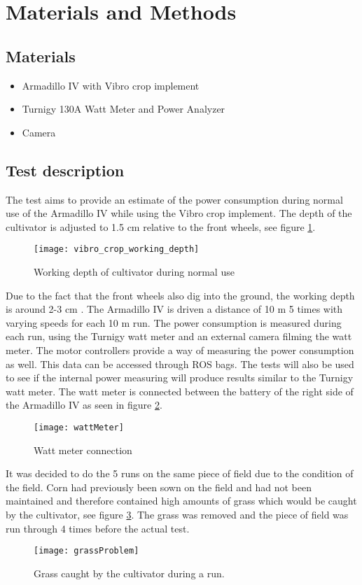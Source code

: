 \section{Materials and Methods}
\subsection{Materials}\label{Materials}
\begin{itemize}
	\item Armadillo IV with Vibro crop implement
	\item Turnigy 130A Watt Meter and Power Analyzer
	\item Camera
\end{itemize}
\subsection{Test description}
The test aims to provide an estimate of the power consumption during normal use of the Armadillo IV while using the Vibro crop implement. The depth of the cultivator is adjusted to 1.5 cm relative to the front wheels, see figure \ref{fig:vibro_crop_working_depth}.
\begin{figure}[hbtp]
	\centering
	\texttt{[image: vibro\_crop\_working\_depth]}
	\caption{Working depth of cultivator during normal use \cite{vibro_crop}}
	\label{fig:vibro_crop_working_depth}
\end{figure}
Due to the fact that the front wheels also dig into the ground, the working depth is around 2-3 cm \cite{vibro_crop}. The Armadillo IV is driven a distance of 10 m 5 times with varying speeds for each 10 m run. The power consumption is measured during each run, using the Turnigy watt meter and an external camera filming the watt meter.
The motor controllers provide a way of measuring the power consumption as well. This data can be accessed through ROS bags. The tests will also be used to see if the internal power measuring will produce results similar to the Turnigy watt meter. The watt meter is connected between the battery of the right side of the Armadillo IV as seen in figure \ref{fig:wattMeter}.

\begin{figure}[hbtp]
	\centering
	\texttt{[image: wattMeter]}
	\caption{Watt meter connection}
	\label{fig:wattMeter}
\end{figure}

It was decided to do the 5 runs on the same piece of field due to the condition of the field. Corn had previously been sown on the field and had not been maintained and therefore contained high amounts of grass which would be caught by the cultivator, see figure \ref{fig:grassProblem}.
The grass was removed and the piece of field was run through 4 times before the actual test. 
\begin{figure}
\centering
	\texttt{[image: grassProblem]}
	\caption{Grass caught by the cultivator during a run.}
\label{fig:grassProblem}
\end{figure}


